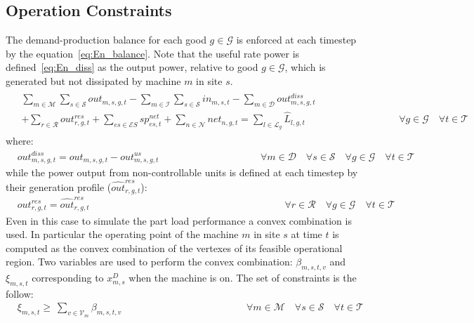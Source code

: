 \documentclass{article}
\newcommand{\cT}{{\mathcal T}}
\newcommand{\cM}{{\mathcal M}}
\newcommand{\cI}{{\mathcal I}}
\newcommand{\cD}{{\mathcal D}}
\newcommand{\cS}{{\mathcal S}}
\newcommand{\cR}{{\mathcal R}}
\newcommand{\cES}{{\mathcal ES}}
\newcommand{\cN}{{\mathcal N}}
\newcommand{\cL}{{\mathcal L}}
\newcommand{\cV}{{\mathcal V}}
\newcommand{\cG}{{\mathcal G}}
\begin{document}
{\subsection{Operation Constraints}
The demand-production balance for each good $g \in \cG$ is enforced at each timestep by the equation~\eqref{eq:En_balance}. Note that the useful rate power is defined~\eqref{eq:En_diss} as the output power, relative to good $g \in \cG$, which is generated but not dissipated by machine $m$ in site $s$. 		
		\begin{align}
		\begin{split}
		& \sum_{m \in \cM} \sum_{s \in \cS} out_{m,s,g,t} - \sum_{m \in \cI} \sum_{s \in \cS} in_{m,s,t} - \sum_{m \in \cD} out_{m,s,g,t}^{diss} \\ 
		& + \sum_{r \in \cR} out_{r,g,t}^{res}  + \sum_{es \in \cES} sp_{es,t}^{net} + \sum_{n \in \cN} net_{n,g,t} = \sum_{l \in \cL_g} \hat{L}_{l,g,t}  \hspace{4cm} \forall g \in \cG \quad \forall t \in \cT \label{eq:En_balance}
		\end{split}		
		\end{align}
		where:
		\begin{align}
		& out_{m,s,g,t}^{diss} = out_{m,s,g,t}  - out_{m,s,g,t}^{us} & \hspace{4cm} \forall m \in \cD \quad \forall s \in \cS \quad \forall g \in \cG \quad \forall t \in \cT \label{eq:En_diss}
		\end{align}
		while the power output from non-controllable units is defined at each timestep by their generation profile ($\hat{out}_{r,g,t}^{res}$):
		\begin{align}
		& out_{r,g,t}^{res} = \hat{out}_{r,g,t}^{res}& \hspace{8cm} \forall r \in \cR \quad \forall g \in \cG \quad \forall t \in \cT \label{eq:En_res}
		\end{align}
Even in this case to simulate the part load performance a convex combination is used. In particular the operating point of the machine $m$ in  site $s$ at time $t$ is computed as the convex combination of the vertexes of its feasible operational region.  
Two variables are used to perform the convex combination: $\beta_{m,s,t,v}$ and $\xi_{m,s,t}$ corresponding to $x_{m,s}^D$ when the machine is on. The set of constraints is the follow: 		
		\begin{align}
		& \xi_{m,s,t} \ge\ \sum_{v \in \cV_m} \beta_{m,s,t,v} & \hspace{5cm} \forall m \in \cM \quad \forall s \in \cS \quad \forall t \in \cT \label{eq:Xi_beta_link}\\

\end{align}}
\end{document}
